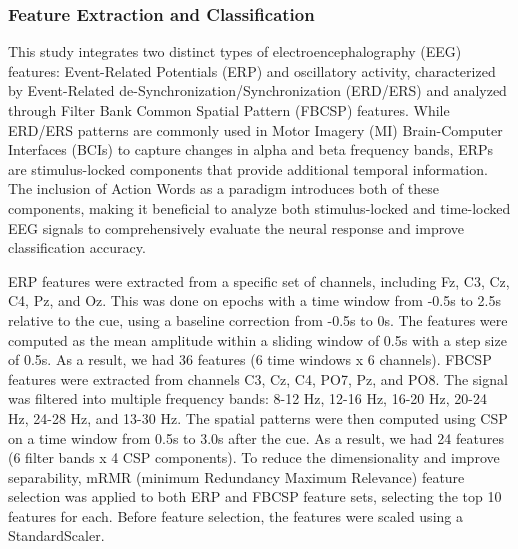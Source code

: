 \documentclass[10pt,letterpaper]{article}
\begin{document}
\subsubsection*{Feature Extraction and Classification}

This study integrates two distinct types of electroencephalography (EEG) features: Event-Related Potentials (ERP) and oscillatory activity, characterized by Event-Related de-Synchronization/Synchronization (ERD/ERS) and analyzed through Filter Bank Common Spatial Pattern (FBCSP) features. While ERD/ERS patterns are commonly used in Motor Imagery (MI) Brain-Computer Interfaces (BCIs) to capture changes in alpha and beta frequency bands, ERPs are stimulus-locked components that provide additional temporal information. The inclusion of Action Words as a paradigm introduces both of these components, making it beneficial to analyze both stimulus-locked and time-locked EEG signals to comprehensively evaluate the neural response and improve classification accuracy.

ERP features were extracted from a specific set of channels, including Fz, C3, Cz, C4, Pz, and Oz. This was done on epochs with a time window from -0.5s to 2.5s relative to the cue, using a baseline correction from -0.5s to 0s. The features were computed as the mean amplitude within a sliding window of 0.5s with a step size of 0.5s. As a result, we had 36 features (6 time windows x 6 channels). FBCSP features were extracted from channels C3, Cz, C4, PO7, Pz, and PO8. The signal was filtered into multiple frequency bands: 8-12 Hz, 12-16 Hz, 16-20 Hz, 20-24 Hz, 24-28 Hz, and 13-30 Hz. The spatial patterns were then computed using CSP on a time window from 0.5s to 3.0s after the cue. As a result, we had 24 features (6 filter bands x 4 CSP components). To reduce the dimensionality and improve separability, mRMR (minimum Redundancy Maximum Relevance) feature selection was applied to both ERP and FBCSP feature sets, selecting the top 10 features for each. Before feature selection, the features were scaled using a StandardScaler.
\end{document}
